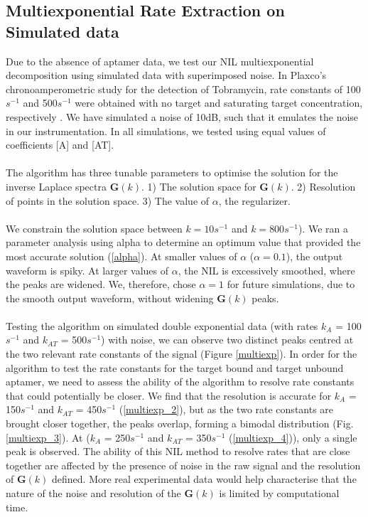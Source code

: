 \subsection{Multiexponential Rate Extraction on Simulated data}
\vspace{-.6cm}
Due to the absence of aptamer data, we test our NIL multiexponential decomposition using simulated data with superimposed noise. In Plaxco's chronoamperometric study for the detection of Tobramycin, rate constants of 100$s^{-1}$ and 500$s^{-1}$ were obtained with no target and saturating target concentration, respectively \cite{arroyo2018subsecond}. We have simulated a noise of 10dB, such that it emulates the noise in our instrumentation. In all simulations, we tested using equal values of coefficients [A] and [AT].\\\\
The algorithm has three tunable parameters to optimise the solution for the inverse Laplace spectra  $\mathbf{G}(k)$. 1) The solution space for $\mathbf{G}(k)$. 2) Resolution of points in the solution space. 3) The value of $\alpha$, the regularizer. \\\\
We constrain the solution space between $k = 10s^{-1}$ and $k = 800s^{-1}$). We ran a parameter analysis using alpha to determine an optimum value that provided the most accurate solution (\autoref{alpha}). At smaller values of $\alpha$ ($\alpha = 0.1$), the output waveform is spiky. At larger values of $\alpha$, the NIL is excessively smoothed, where the peaks are widened.  We, therefore, chose $\alpha = 1$ for future simulations, due to the smooth output waveform, without widening $\mathbf{G}(k)$ peaks.\\\\
Testing the algorithm on simulated double exponential data (with rates $k_{A}$ = 100$s^{-1}$ and $k_{AT}$ = 500$s^{-1}$) with noise, we can observe two distinct peaks centred at the two relevant rate constants of the signal (Figure \ref{multiexp}). In order for the algorithm to test the rate constants for the target bound and target unbound aptamer, we need to assess the ability of the algorithm to resolve rate constants that could potentially be closer. We find that the resolution is accurate for $k_{A}$ = 150$s^{-1}$ and $k_{AT}$ = 450$s^{-1}$ (\autoref{multiexp_2}), but as the two rate constants are brought closer together, the peaks overlap, forming a bimodal distribution (Fig. \ref{multiexp_3}). At ($k_{A}$ = 250$s^{-1}$ and $k_{AT}$ = 350$s^{-1}$ (\autoref{multiexp_4})), only a single peak is observed. The ability of this NIL method to resolve rates that are close together are affected by the presence of noise in the raw signal and the resolution of $\mathbf{G}(k)$ defined. More real experimental data would help characterise that the nature of the noise and resolution of the $\mathbf{G}(k)$ is limited by computational time.\\\\
